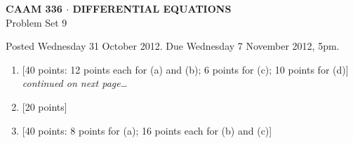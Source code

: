 \documentclass[10pt]{article}
\begin{document}

\begin{center}
\large \textsf{\textbf{CAAM 336 $\cdot$ DIFFERENTIAL EQUATIONS}\\[0.5em]
 Problem Set 9 }
\end{center}

Posted Wednesday 31 October 2012.  Due Wednesday 7 November 2012, 5pm.

\begin{enumerate}
\item {[40 points: 12 points each for (a) and (b); 6 points for (c); 10 points for (d)]}\\[-2em]  
  

\vspace*{-2em}
\hfill \emph{continued on next page\ldots}

\item {[20 points]}\\  

\item {[40 points: 8 points for (a); 16 points each for (b) and (c)]}\\  

\end{enumerate}
\end{document}

